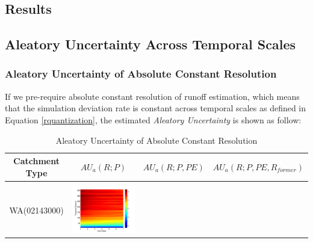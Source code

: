 \documentclass[draft,wrr]{AGUTeX}
\begin{document}
\begin{article}
\section{Results}
\subsection{Aleatory Uncertainty Across Temporal Scales} 

\subsubsection{Aleatory Uncertainty of Absolute Constant Resolution}

If we pre-require absolute constant resolution of runoff estimation, which means that the simulation deviation rate is constant across temporal scales as defined in Equation \eqref{rquantization}, the estimated \emph{Aleatory Uncertainty} is shown as follow:
\begin{table}[H] \small
\caption{Aleatory Uncertainty of Absolute Constant Resolution}
\label{table:AAU}
\centering
\begin{tabular}{cccc}
\hline
\textbf{Catchment Type}&\textbf{$AU_a(R;P)$}&\textbf{$AU_a(R;P,PE)$}&\textbf{$AU_a(R;P,PE,R_{former})$}\\
\hline
\\
WA(02143000) 
&\begin{minipage}{.3\textwidth}\includegraphics[width=\linewidth]{resultgraph/02143000p_abs.png}\end{minipage}

\end{tabular}
\end{table}
\end{article}
\end{document}
